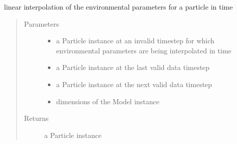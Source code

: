 \documentclass[letterpaper,10pt,english]{sphinxmanual}
\begin{document}
\begin{fulllineitems}
\label{\detokenize{octapy:octapy.tracking.interp_for_time}}
\sphinxAtStartPar
linear interpolation of the environmental parameters for a particle in
time
\begin{quote}\begin{description}
\item[{Parameters}] \leavevmode\begin{itemize}
\item {} 
\sphinxAtStartPar
{} \textendash{} a Particle instance at an invalid timestep for which environmental
parameters are being interpolated in time

\item {} 
\sphinxAtStartPar
{} \textendash{} a Particle instance at the last valid data timestep

\item {} 
\sphinxAtStartPar
{} \textendash{} a Particle instance at the next valid data timestep

\item {} 
\sphinxAtStartPar
{} \textendash{} dimensions of the Model instance

\end{itemize}

\item[{Returns}] \leavevmode
\sphinxAtStartPar
a Particle instance

\end{description}\end{quote}

\end{fulllineitems}

\end{document}
